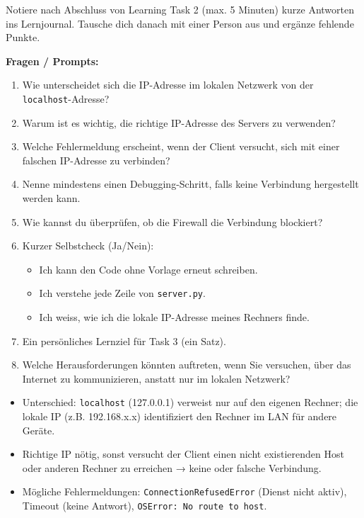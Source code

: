 \begin{myexercise}
Notiere nach Abschluss von Learning Task 2 (max. 5 Minuten) kurze Antworten ins Lernjournal. Tausche dich danach mit einer Person aus und ergänze fehlende Punkte.

\textbf{Fragen / Prompts:}
\begin{enumerate}
    \item Wie unterscheidet sich die IP-Adresse im lokalen Netzwerk von der \texttt{localhost}-Adresse?
    \item Warum ist es wichtig, die richtige IP-Adresse des Servers zu verwenden?
    \item Welche Fehlermeldung erscheint, wenn der Client versucht, sich mit einer falschen IP-Adresse zu verbinden?
    \item Nenne mindestens einen Debugging-Schritt, falls keine Verbindung hergestellt werden kann.
    \item Wie kannst du überprüfen, ob die Firewall die Verbindung blockiert?
    \item Kurzer Selbstcheck (Ja/Nein): 
        \begin{itemize}
            \item Ich kann den Code ohne Vorlage erneut schreiben.
            \item Ich verstehe jede Zeile von \texttt{server.py}.
            \item Ich weiss, wie ich die lokale IP-Adresse meines Rechners finde.
        \end{itemize}
    \item Ein persönliches Lernziel für Task 3 (ein Satz).
    \item Welche Herausforderungen könnten auftreten, wenn Sie versuchen, über das Internet zu kommunizieren, anstatt nur im lokalen Netzwerk?
\end{enumerate}
\begin{myanswer}
\begin{itemize}
    \item Unterschied: \texttt{localhost} (127.0.0.1) verweist nur auf den eigenen Rechner; die lokale IP (z.B. 192.168.x.x) identifiziert den Rechner im LAN für andere Geräte.
    \item Richtige IP nötig, sonst versucht der Client einen nicht existierenden Host oder anderen Rechner zu erreichen → keine oder falsche Verbindung.
    \item Mögliche Fehlermeldungen: \texttt{ConnectionRefusedError} (Dienst nicht aktiv), Timeout (keine Antwort), \texttt{OSError: No route to host}.

\end{itemize}
\end{myanswer}
\end{myexercise}
